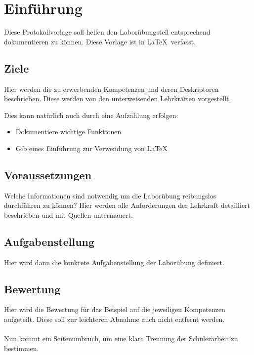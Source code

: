 
\section{Einführung}
Diese Protokollvorlage soll helfen den Laborübungsteil entsprechend dokumentieren zu können. Diese Vorlage ist in \LaTeX ~verfasst.

\subsection{Ziele}
Hier werden die zu erwerbenden Kompetenzen und deren Deskriptoren beschrieben. Diese werden von den unterweisenden Lehrkräften vorgestellt.

Dies kann natürlich auch durch eine Aufzählung erfolgen:
\begin{itemize}
	\item Dokumentiere wichtige Funktionen
	\item Gib eines Einführung zur Verwendung von \LaTeX
\end{itemize}

\subsection{Voraussetzungen}
Welche Informationen sind notwendig um die Laborübung reibungslos durchführen zu können? Hier werden alle Anforderungen der Lehrkraft detailliert beschrieben und mit Quellen untermauert.

\subsection{Aufgabenstellung}
Hier wird dann die konkrete Aufgabenstellung der Laborübung definiert.

\subsection{Bewertung}
Hier wird die Bewertung für das Beispiel auf die jeweiligen Kompetenzen aufgeteilt. Diese soll zur leichteren Abnahme auch nicht entfernt werden.
\\\\
Nun kommt ein Seitenumbruch, um eine klare Trennung der Schülerarbeit zu bestimmen.
\clearpage
